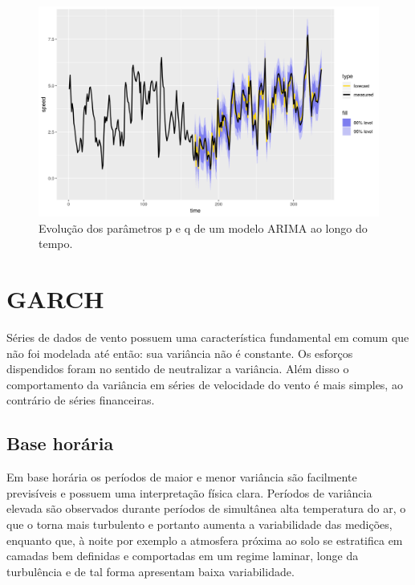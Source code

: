 \documentclass[
	12pt,				%
	openright,			%
	oneside,			%
	a4paper,			%
	english,			%
	french,				%
	spanish,			%
	brazil				%
	]{abntex2}
\begin{document}

\begin{figure}[h]
    \centering
	\includegraphics[width=\textwidth]{var_result}
	\caption{Evolução dos parâmetros p e q de um modelo ARIMA ao longo do tempo.}
\end{figure}
\FloatBarrier

\chapter{GARCH}

Séries de dados de vento possuem uma característica fundamental em comum que não foi modelada até então: sua variância não é constante. Os esforços dispendidos foram no sentido de neutralizar a variância. Além disso o comportamento da variância em séries de velocidade do vento é mais simples, ao contrário de séries financeiras.

\section{Base horária}

Em base horária os períodos de maior e menor variância são facilmente previsíveis e possuem uma interpretação física clara. Períodos de variância elevada são observados durante períodos de simultânea alta temperatura do ar, o que o torna mais turbulento e portanto aumenta a variabilidade das medições, enquanto que, à noite por exemplo a atmosfera próxima ao solo se estratifica em camadas bem definidas e comportadas em um regime laminar, longe da turbulência e de tal forma apresentam baixa variabilidade.
\end{document}
